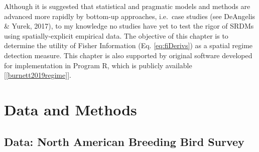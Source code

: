 \documentclass[12pt,twoside,openany]{reedthesis}
\begin{document}
Although it is suggested that statistical and pragmatic models and methods are advanced more rapidly by bottom-up approaches, i.e.~case studies (see DeAngelis \& Yurek, 2017), to my knowledge no studies have yet to test the rigor of SRDMs using spatially-explicit empirical data. The objective of this chapter is to determine the utility of Fisher Information (Eq. \eqref{eq:fiDerivs}) as a spatial regime detection measure. This chapter is also supported by original software developed for implementation in Program R, which is publicly available {[}\ref{burnett2019regime}{]}.

\hypertarget{data-and-methods}{%
\section{Data and Methods}\label{data-and-methods}}

\hypertarget{data-north-american-breeding-bird-survey}{%
\subsection{Data: North American Breeding Bird Survey}\label{data-north-american-breeding-bird-survey}}
\end{document}
